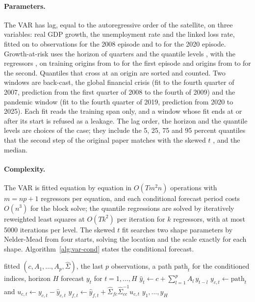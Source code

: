 \paragraph{Parameters.}
The VAR has {\agstVarLags} lag, equal to the autoregressive order of the satellite, on three variables: real GDP growth, the
unemployment rate and the linked loss rate, fitted on {\agstVarNMinGfc} to {\agstVarNMaxGfc} observations for the 2008 episode
and {\agstVarNMinPan} to {\agstVarNMaxPan} for the 2020 episode. Growth-at-risk uses the horizon of {\agstGarHorizon} quarters
and the quantile levels {\agstGarTaus}, with the regressors {\agstGarRegressors}, on {\agstGarTrainGfc} training origins from
{\agstGarTrainFirstGfc} to {\agstGarTrainLastGfc} for the first episode and {\agstGarTrainPan} origins from {\agstGarTrainFirstPan}
to {\agstGarTrainLastPan} for the second. Quantiles that cross at an origin are sorted and counted. Two windows are back-cast,
the global financial crisis (fit to the fourth quarter of 2007, prediction from the first quarter of 2008 to the fourth of 2009)
and the pandemic window (fit to the fourth quarter of 2019, prediction from 2020 to 2025). Each fit reads the training span
only, and a window whose fit ends at or after its start is refused as a leakage. The lag order, the horizon and the quantile
levels are choices of the case; they include the 5, 25, 75 and 95 percent quantiles that the second step of the original
paper matches with the skewed $t$ \citep{aggregation-stress:abg2019}, and the median.

\paragraph{Complexity.}
The VAR is fitted equation by equation in $O(Tm^{2}n)$ operations with $m=np+1$ regressors per equation, and each conditional
forecast period costs $O(n^{3})$ for the block solve; the quantile regressions are solved by iteratively reweighted least squares
at $O(Tk^{2})$ per iteration for $k$ regressors, with at most 5000 iterations per level. The skewed $t$ fit searches two shape
parameters by Nelder-Mead from four starts, solving the location and the scale exactly for each shape. Algorithm~\ref{alg:var-cond}
states the conditional forecast.

\begin{algorithm}[htbp]
\caption{Period-by-period VAR conditional forecast given a path for a subset of the variables.}
\label{alg:var-cond}
\begin{algorithmic}[1]
\Require fitted $(c,A_1,\dots,A_p,\hat\Sigma)$, the last $p$ observations, a path $\mathrm{path}_t$ for the conditioned indices, horizon $H$
\Ensure forecast $y_t$ for $t=1,\dots,H$
  \State $\hat y_t\gets c+\sum_{l=1}^{p}A_l\,y_{t-l}$
  \State $y_{c,t}\gets\mathrm{path}_t$ and $u_{c,t}\gets y_{c,t}-\hat y_{c,t}$
  \State $y_{f,t}\gets\hat y_{f,t}+\hat\Sigma_{fc}\hat\Sigma_{cc}^{-1}u_{c,t}$
\EndFor
\State \Return $y_1,\dots,y_H$
\end{algorithmic}
\end{algorithm}

